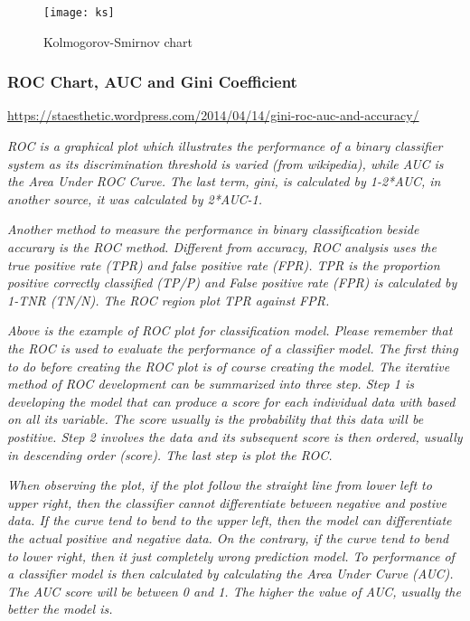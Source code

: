 \begin{figure}[H]
	\texttt{[image: ks]}
	\caption[Kolmogorov-Smirnov chart ]
	{Kolmogorov-Smirnov chart }
	\label{fig:ks}
\end{figure}



\subsubsection{ROC Chart, AUC and Gini Coefficient}
\url{https://staesthetic.wordpress.com/2014/04/14/gini-roc-auc-and-accuracy/}

\textit{ROC is a graphical plot which illustrates the performance of a binary classifier system as its discrimination threshold is varied (from wikipedia), while AUC is the Area Under ROC Curve. The last term, gini, is calculated by 1-2*AUC, in another source, it was calculated by 2*AUC-1.}

\textit{Another method to measure the performance in binary classification beside accurary is the ROC method. Different from accuracy, ROC analysis uses the true positive rate (TPR) and false positive rate (FPR). TPR is the proportion positive correctly classified (TP/P) and  False positive rate (FPR) is calculated by 1-TNR (TN/N). The ROC region plot TPR against FPR.}

\textit{Above is the example of ROC plot for classification model. Please remember that the ROC is used to evaluate the performance of a classifier model. The first thing to do before creating the ROC plot is of course creating the model. The iterative method of ROC development can be summarized into three step. Step 1 is developing the model that can produce a score for each individual data with based on all its variable. The score usually is the probability that this data will be postitive. Step 2 involves the data and its subsequent score is then ordered, usually in descending order (score). The last step is plot the ROC.}

\textit{When observing the plot, if the plot follow the straight line from lower left to upper right, then the classifier cannot differentiate between negative and postive data. If the curve tend to bend to the upper left, then the model can differentiate the actual positive and negative data. On the contrary, if the curve tend to bend to lower right, then it just completely wrong prediction model.
To performance of a classifier model is then calculated by calculating the Area Under Curve (AUC). The AUC score will be between 0 and 1. The higher the value of AUC, usually the better the model is.}

